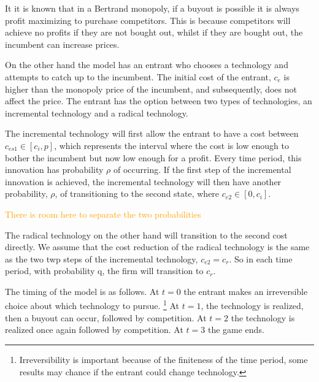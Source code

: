 \documentclass{article}
\begin{document}
It it is known that in a Bertrand monopoly, if a buyout is possible it is always profit maximizing to purchase competitors. This is because competitors will achieve no profits if they are not bought out, whilst if they are bought out, the incumbent can increase prices. 

On the other hand the model has an entrant who chooses a technology and attempts to catch up to the incumbent. The initial cost of the entrant, $c_e$ is higher than the monopoly price of the incumbent, and subsequently, does not affect the price. The entrant has the option between two types of technologies, an incremental technology and a radical technology. 

The incremental technology will first allow the entrant to have a cost between $c_{es1} \in [c_i,p]$, which represents the interval where the cost is low enough to bother the incumbent but now low enough for a profit. Every time period, this innovation has probability $\rho$ of occurring. If the first step of the incremental innovation is achieved, the incremental technology will then have another probability, $\rho$, of transitioning to the second state, where  $c_{e2}\in [0,c_i]$. 

\textcolor{orange}{There is room here to separate the two probabilities}

The radical technology on the other hand will transition to the second cost directly. We assume that the cost reduction of the radical technology is the same as the two twp steps of the incremental technology, $c_{e2}=c_r$. So in each time period, with probability q, the firm will transition to $c_r$. 

The timing of the model is as follows. At $t=0$ the entrant makes an irreversible choice about which technology to pursue. \footnote{Irreversibility is important because of the finiteness of the time period, some results may chance if the entrant could change technology. } At $t=1$, the technology is realized, then a buyout can occur, followed by competition. At $t = 2$ the technology is realized once again followed by competition. At $t = 3$ the game ends. 
\end{document}
